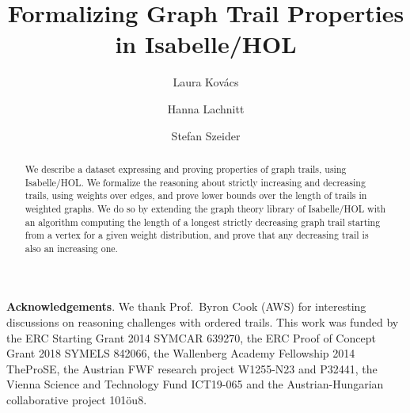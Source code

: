 \documentclass[runningheads]{llncs}
\begin{document}
\title{Formalizing Graph Trail Properties in Isabelle/HOL}
\author{Laura Kov{\'a}cs \and Hanna Lachnitt \and Stefan Szeider}
\maketitle


\begin{abstract}
	We describe a dataset expressing and proving properties of graph trails, using Isabelle/HOL.
	We formalize the reasoning about strictly increasing and decreasing trails, using weights over edges,
	and prove lower bounds over the length of trails in weighted graphs. We do so by extending the graph theory library of Isabelle/HOL with an algorithm computing the length of a longest strictly decreasing graph trail starting from a vertex for a given weight distribution, and prove that any decreasing trail is also an increasing one.
\end{abstract}






\bigskip\noindent\textbf{Acknowledgements}. We thank Prof.~Byron Cook (AWS) for interesting discussions on reasoning challenges with ordered trails. This work was funded by the ERC Starting Grant 2014 SYMCAR
639270, the ERC Proof of Concept Grant 2018 SYMELS 842066, the Wallenberg Academy
Fellowship 2014 TheProSE, the Austrian FWF research project W1255-N23 and P32441,  the Vienna Science and Technology Fund ICT19-065 and the Austrian-Hungarian collaborative project 101\"ou8.

%

 
\end{document}
